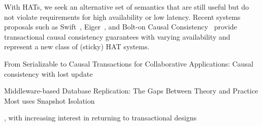 With HATs, we seek an alternative set of semantics that are still
useful but do not violate requirements for high availability or low
latency. Recent systems proposals such as Swift~\cite{swift},
Eiger~\cite{eiger}, and Bolt-on Causal Consistency~\cite{bolton}
provide transactional causal consistency guarantees with varying
availability and represent a new class of (sticky) HAT
systems. 




From Serializable to Causal Transactions for Collaborative Applications: Causal consistency with lost update


Middleware-based Database Replication: The Gaps Between Theory and Practice
Most uses Snapshot Isolation




, with increasing interest in returning to transactional
designs~\cite{spanner, walter, foundation-article, krikellas-bargain,
  eiger}

